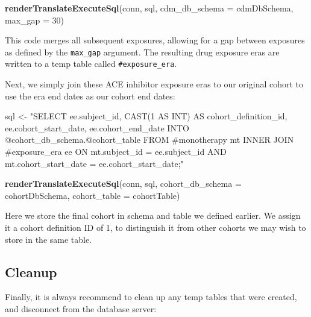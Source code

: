 \documentclass[11pt]{book}
\newenvironment{Shaded}{\begin{snugshade}}{\end{snugshade}}
\newcommand{\DataTypeTok}[1]{\textcolor[rgb]{0.13,0.29,0.53}{#1}}
\newcommand{\DecValTok}[1]{\textcolor[rgb]{0.00,0.00,0.81}{#1}}
\newcommand{\KeywordTok}[1]{\textcolor[rgb]{0.13,0.29,0.53}{\textbf{#1}}}
\newcommand{\NormalTok}[1]{#1}
\newcommand{\StringTok}[1]{\textcolor[rgb]{0.31,0.60,0.02}{#1}}
\theoremstyle{definition}
\theoremstyle{definition}
\theoremstyle{definition}
\theoremstyle{remark}
\begin{document}
\begin{Shaded}
\begin{Highlighting}[]
\KeywordTok{renderTranslateExecuteSql}\NormalTok{(conn,}
\NormalTok{                          sql, }
                          \DataTypeTok{cdm_db_schema =}\NormalTok{ cdmDbSchema,}
                          \DataTypeTok{max_gap =} \DecValTok{30}\NormalTok{)}
\end{Highlighting}
\end{Shaded}

This code merges all subsequent exposures, allowing for a gap between exposures as defined by the \texttt{max\_gap} argument. The resulting drug exposure eras are written to a temp table called \texttt{\#exposure\_era}.

Next, we simply join these ACE inhibitor exposure eras to our original cohort to use the era end dates as our cohort end dates:

\begin{Shaded}
\begin{Highlighting}[]
\NormalTok{sql <-}\StringTok{ "SELECT ee.subject_id,}
\StringTok{  CAST(1 AS INT) AS cohort_definition_id,}
\StringTok{  ee.cohort_start_date,}
\StringTok{  ee.cohort_end_date}
\StringTok{INTO @cohort_db_schema.@cohort_table}
\StringTok{FROM #monotherapy mt}
\StringTok{INNER JOIN #exposure_era ee}
\StringTok{  ON mt.subject_id = ee.subject_id}
\StringTok{    AND mt.cohort_start_date = ee.cohort_start_date;"}

\KeywordTok{renderTranslateExecuteSql}\NormalTok{(conn, }
\NormalTok{                          sql, }
                          \DataTypeTok{cohort_db_schema =}\NormalTok{ cohortDbSchema, }
                          \DataTypeTok{cohort_table =}\NormalTok{ cohortTable)}
\end{Highlighting}
\end{Shaded}

Here we store the final cohort in schema and table we defined earlier. We assign it a cohort definition ID of 1, to distinguish it from other cohorts we may wish to store in the same table.

\hypertarget{cleanup}{%
\subsection{Cleanup}\label{cleanup}}

Finally, it is always recommend to clean up any temp tables that were created, and disconnect from the database server:
\end{document}
